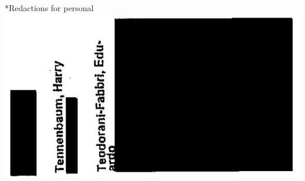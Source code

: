 \documentclass[10pt]{article}
\begin{document}
*Redactions for personal\\
\includegraphics[max width=\textwidth, center]{2025_02_27_dd68c3d38de88f0516d9g-175(2)}\\
\end{document}
